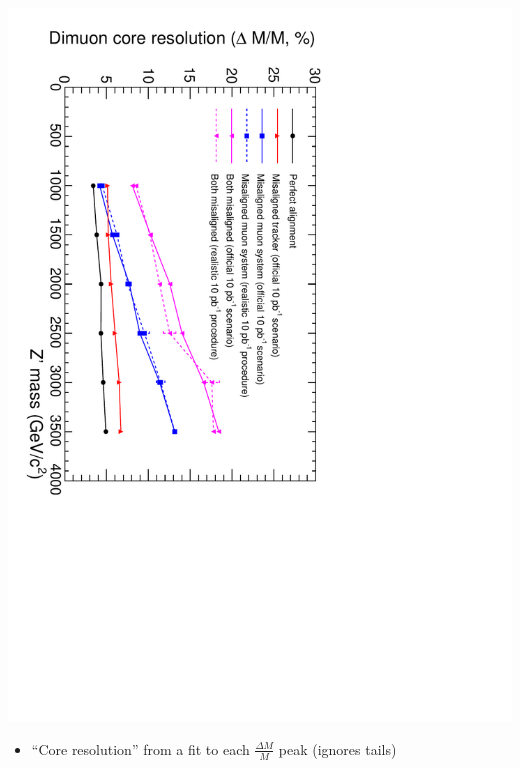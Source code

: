 \documentclass[compress]{beamer}
\begin{document}
\begin{frame}
\includegraphics[height=\linewidth, angle=90]{ZSSM_Align_MassRes_color.pdf}
\begin{itemize}
\item ``Core resolution'' from a fit to each $\displaystyle \frac{\Delta M}{M}$ peak (ignores tails)
\end{itemize}
\end{frame}
\end{document}
